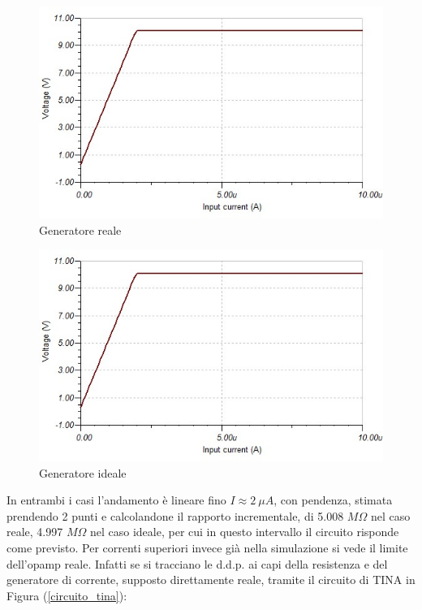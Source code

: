 \documentclass[journal, a4paper]{IEEEtran}
\begin{document}
\begin{figure}[htp]
\centering
\includegraphics[scale=.35]{convertitore_analysis}
\caption{Generatore reale}
\label{gen_rel}
\end{figure}

\begin{figure}[htp]
\centering
\includegraphics[scale=.35]{convertitore_analysis_infinite}
\caption{Generatore ideale\\}
\label{gen_id}
\end{figure}

In entrambi i casi l'andamento è lineare fino $I\approx 2~\mu A$, con pendenza, stimata prendendo 2 punti e calcolandone il rapporto incrementale, di 5.008 $M\Omega$ nel caso reale, 4.997 $M\Omega$ nel caso ideale, per cui in questo intervallo il circuito risponde come previsto. Per correnti superiori invece già nella simulazione si vede il limite dell'opamp reale. Infatti se si tracciano le d.d.p. ai capi della resistenza e del generatore di corrente, supposto direttamente reale, tramite il circuito di TINA in Figura (\ref{circuito_tina}):
\end{document}
